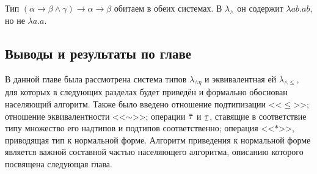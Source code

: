 \documentclass[../main.tex]{subfiles}
\begin{document}
\begin{notice}
    Тип  $(\alpha \to \beta \wedge \gamma) \to \alpha \to \beta$ обитаем в обеих системах. В $\lambda_{\wedge}$ он содержит $\lambda a b . a b$, но не $\lambda a . a$.
\end{notice}

\subsection{Выводы и результаты по главе}

В данной главе была рассмотрена система типов $\lambda_{\wedge \eta}$ и эквивалентная ей $\lambda_{\wedge \leqslant}$, для которых в следующих разделах будет приведён и формально обоснован населяющий алгоритм. Также было введено отношение подтипизации <<$\leqslant$>>; отношение эквивалентности <<$\sim$>>; операции $\ob{\tau}$ и $\ub{\tau}$, ставящие в соответствие типу множество его надтипов и подтипов соответственно;  операция <<$*$>>, приводящая тип к нормальной форме. Алгоритм приведения к нормальной форме является важной составной частью населяющего алгоритма, описанию которого посвящена следующая глава.
\end{document}
